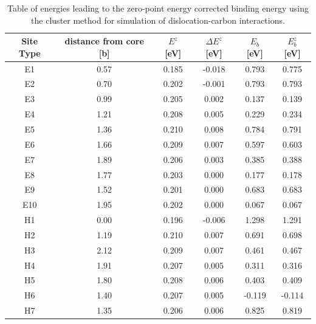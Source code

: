 \documentclass[a4paper,11pt]{article}
\begin{document}
\begin{table}
    \begin{tabular}{cccccc}
    \hline
Site Type & distance from core [b] & $E^{z}$ [eV] & $\Delta E^{z}$ [eV] & $E_b$ [eV] & $E_b^{z}$ [eV]  \\ 
     \hline
E1        &                   0.57 &   0.185      & 	     -0.018 &       0.793 &          0.775 \\
E2        &                   0.70 &   0.202      & 	     -0.001 &       0.793 &          0.793 \\
E3        &                   0.99 &   0.205      & 	      0.002 &       0.137 &          0.139 \\
E4        &                   1.21 &   0.208      & 	      0.005 &       0.229 &          0.234 \\
E5        &                   1.36 &   0.210      & 	      0.008 &       0.784 &          0.791 \\
E6        &                   1.66 &   0.209      & 	      0.007 &       0.597 &          0.603 \\
E7        &                   1.89 &   0.206      & 	      0.003 &       0.385 &          0.388 \\
E8        &                   1.77 &   0.203      & 	      0.000 &       0.177 &          0.178 \\
E9        &                   1.52 &   0.201      & 	      0.000 &       0.683 &          0.683 \\
E10       &                   1.95 &   0.202      & 	      0.000 &       0.067 &          0.067 \\ \hline
H1        &                   0.00 &   0.196      & 	     -0.006 &       1.298 &          1.291 \\
H2        &                   1.19 &   0.210      & 	      0.007 &       0.691 &          0.698 \\
H3        &                   2.12 &   0.209      & 	      0.007 &       0.461 &          0.467 \\
H4        &                   1.91 &   0.207      & 	      0.005 &       0.311 &          0.316 \\
H5        &                   1.80 &   0.208      & 	      0.006 &       0.403 &          0.409 \\
H6        &                   1.40 &   0.207      & 	      0.005 &      -0.119 &         -0.114 \\
H7        &                   1.35 &   0.206      & 	      0.006 &       0.825 &          0.819 \\

    \end{tabular}		
    \caption{Table of energies leading to the zero-point energy corrected binding energy using the cluster method for simulation of dislocation-carbon interactions. }
    \label{tab:bindingenergies}
\end{table}
\end{document}
